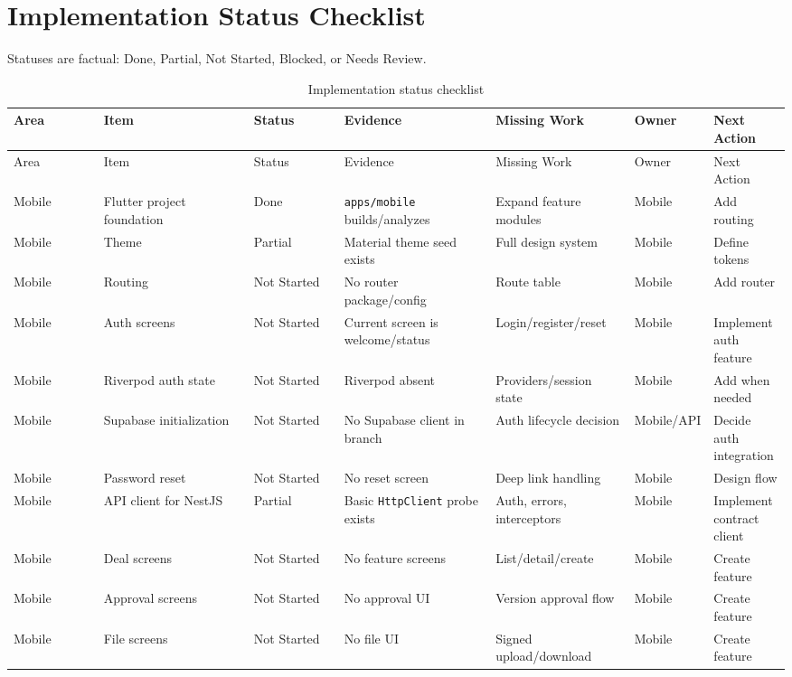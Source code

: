 \chapter*{Implementation Status Checklist}

Statuses are factual: Done, Partial, Not Started, Blocked, or Needs Review.

\begin{longtable}{p{0.12\linewidth}p{0.2\linewidth}p{0.12\linewidth}p{0.2\linewidth}p{0.18\linewidth}p{0.08\linewidth}p{0.14\linewidth}}
\caption{Implementation status checklist}\\
\toprule
Area & Item & Status & Evidence & Missing Work & Owner & Next Action \\
\midrule
\endfirsthead
\toprule
Area & Item & Status & Evidence & Missing Work & Owner & Next Action \\
\midrule
\endhead
Mobile & Flutter project foundation & Done & \texttt{apps/mobile} builds/analyzes & Expand feature modules & Mobile & Add routing \\
Mobile & Theme & Partial & Material theme seed exists & Full design system & Mobile & Define tokens \\
Mobile & Routing & Not Started & No router package/config & Route table & Mobile & Add router \\
Mobile & Auth screens & Not Started & Current screen is welcome/status & Login/register/reset & Mobile & Implement auth feature \\
Mobile & Riverpod auth state & Not Started & Riverpod absent & Providers/session state & Mobile & Add when needed \\
Mobile & Supabase initialization & Not Started & No Supabase client in branch & Auth lifecycle decision & Mobile/API & Decide auth integration \\
Mobile & Password reset & Not Started & No reset screen & Deep link handling & Mobile & Design flow \\
Mobile & API client for NestJS & Partial & Basic \texttt{HttpClient} probe exists & Auth, errors, interceptors & Mobile & Implement contract client \\
Mobile & Deal screens & Not Started & No feature screens & List/detail/create & Mobile & Create feature \\
Mobile & Approval screens & Not Started & No approval UI & Version approval flow & Mobile & Create feature \\
Mobile & File screens & Not Started & No file UI & Signed upload/download & Mobile & Create feature \\

\end{longtable}
